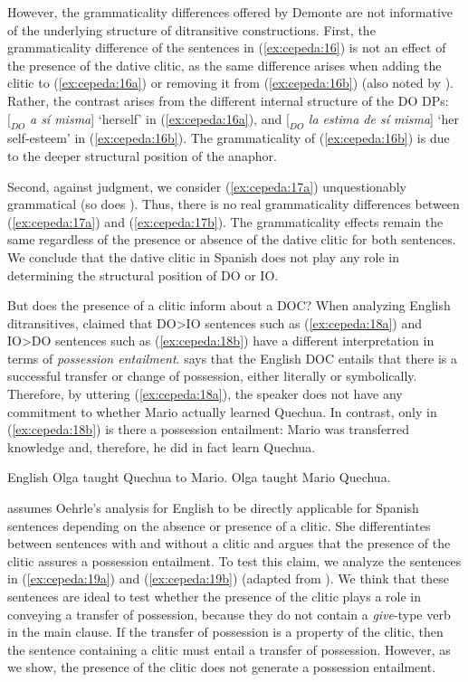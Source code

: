 \documentclass[output=paper,colorlinks,citecolor=brown]{./langscibook}
\begin{document}
However, the grammaticality differences offered by Demonte are not informative of the underlying structure of ditransitive constructions. First, the grammaticality difference of the sentences in (\ref{ex:cepeda:16}) is not an effect of the presence of the dative clitic, as the same difference arises when adding the clitic to (\ref{ex:cepeda:16a}) or removing it from (\ref{ex:cepeda:16b}) (also noted by \citealt{Pineda2013}). Rather, the contrast arises from the different internal structure of the DO DPs: $[_{DO}$ \textit{a sí misma}] ‘herself’ in (\ref{ex:cepeda:16a}), and $[_{DO}$ \textit{la estima de sí misma}] ‘her self-esteem’ in (\ref{ex:cepeda:16b}). The grammaticality of (\ref{ex:cepeda:16b}) is due to the deeper structural position of the anaphor.

Second, against  judgment, we consider (\ref{ex:cepeda:17a}) unquestionably grammatical (so does \citealt{Pineda2013}). Thus, there is no real grammaticality differences between (\ref{ex:cepeda:17a}) and (\ref{ex:cepeda:17b}). The grammaticality effects remain the same regardless of the presence or absence of the dative clitic for both sentences. We conclude that the dative clitic in Spanish does not play any role in determining the structural position of DO or IO.

But does the presence of a clitic inform about a DOC? When analyzing English ditransitives, \citet{Oehrle1976} claimed that DO>IO sentences such as (\ref{ex:cepeda:18a}) and IO>DO sentences such as (\ref{ex:cepeda:18b}) have a different interpretation in terms of \textit{possession entailment}. \citeauthor{Oehrle1976} says that the English DOC entails that there is a successful transfer or change of possession, either literally or symbolically. Therefore, by uttering (\ref{ex:cepeda:18a}), the speaker does not have any commitment to whether Mario actually learned Quechua. In contrast, only in (\ref{ex:cepeda:18b}) is there a possession entailment: Mario was transferred knowledge and, therefore, he did in fact learn Quechua.

\ea%
    \label{ex:cepeda:18} English
	\ea\label{ex:cepeda:18a} Olga taught Quechua to Mario.
	\ex\label{ex:cepeda:18b} Olga taught Mario Quechua.
	\z
\z

\citet{Demonte1995} assumes Oehrle’s analysis for English to be directly applicable for Spanish sentences depending on the absence or presence of a clitic. She differentiates between sentences with and without a clitic and argues that the presence of the clitic assures a possession entailment. To test this claim, we analyze the sentences in (\ref{ex:cepeda:19a}) and (\ref{ex:cepeda:19b}) (adapted from \citeauthor{Demonte1995}). We think that these sentences are ideal to test whether the presence of the clitic plays a role in conveying a transfer of possession, because they do not contain a \textit{give}-type verb in the main clause. If the transfer of possession is a property of the clitic, then the sentence containing a clitic must entail a transfer of possession. However, as we show, the presence of the clitic does not generate a possession entailment.
\end{document}
